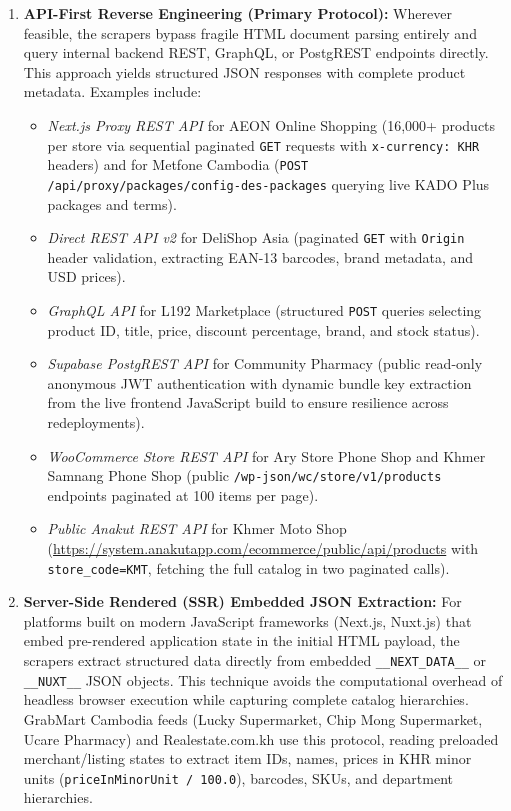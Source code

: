 \begin{enumerate}
    \item \textbf{API-First Reverse Engineering (Primary Protocol):} Wherever feasible, the scrapers bypass fragile HTML document parsing entirely and query internal backend REST, GraphQL, or PostgREST endpoints directly. This approach yields structured JSON responses with complete product metadata. Examples include:
    \begin{itemize}[noitemsep]
        \item \textit{Next.js Proxy REST API} for AEON Online Shopping (16{,}000+ products per store via sequential paginated \texttt{GET} requests with \texttt{x-currency: KHR} headers) and for Metfone Cambodia (\texttt{POST /api/proxy/packages/config-des-packages} querying live KADO Plus packages and terms).
        \item \textit{Direct REST API v2} for DeliShop Asia (paginated \texttt{GET} with \texttt{Origin} header validation, extracting EAN-13 barcodes, brand metadata, and USD prices).
        \item \textit{GraphQL API} for L192 Marketplace (structured \texttt{POST} queries selecting product ID, title, price, discount percentage, brand, and stock status).
        \item \textit{Supabase PostgREST API} for Community Pharmacy (public read-only anonymous JWT authentication with dynamic bundle key extraction from the live frontend JavaScript build to ensure resilience across redeployments).
        \item \textit{WooCommerce Store REST API} for Ary Store Phone Shop and Khmer Samnang Phone Shop (public \texttt{/wp-json/wc/store/v1/products} endpoints paginated at 100 items per page).
        \item \textit{Public Anakut REST API} for Khmer Moto Shop (\url{https://system.anakutapp.com/ecommerce/public/api/products} with \texttt{store\_code=KMT}, fetching the full catalog in two paginated calls).
    \end{itemize}

    \item \textbf{Server-Side Rendered (SSR) Embedded JSON Extraction:} For platforms built on modern JavaScript frameworks (Next.js, Nuxt.js) that embed pre-rendered application state in the initial HTML payload, the scrapers extract structured data directly from embedded \texttt{\_\_NEXT\_DATA\_\_} or \texttt{\_\_NUXT\_\_} JSON objects. This technique avoids the computational overhead of headless browser execution while capturing complete catalog hierarchies. GrabMart Cambodia feeds (Lucky Supermarket, Chip Mong Supermarket, Ucare Pharmacy) and Realestate.com.kh use this protocol, reading preloaded merchant/listing states to extract item IDs, names, prices in KHR minor units (\texttt{priceInMinorUnit / 100.0}), barcodes, SKUs, and department hierarchies.


\end{enumerate}
